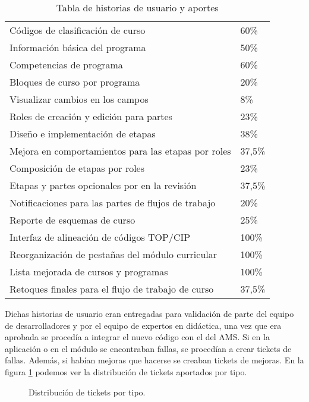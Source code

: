 \begin{table}[H]
\begin{tabular}{@{}ll@{}}
Códigos de clasificación de curso                   &  60\%  \\
Información básica del programa                     &  50\%  \\
Competencias de programa                            &  60\%  \\
Bloques de curso por programa                       &  20\%  \\
Visualizar cambios en los campos                    &   8\%  \\
Roles de creación y edición para partes             &  23\%  \\
Diseño e implementación de etapas                   &  38\%  \\
Mejora en comportamientos para las etapas por roles & 37,5\% \\
Composición de etapas por roles                     &  23\%  \\
Etapas y partes opcionales por en la revisión       & 37,5\% \\
Notificaciones para las partes de flujos de trabajo &  20\%  \\
Reporte de esquemas de curso                        &  25\%  \\
Interfaz de alineación de códigos TOP/CIP           & 100\%  \\
Reorganización de pestañas del módulo curricular    & 100\%  \\
Lista mejorada de cursos y programas                & 100\%  \\
Retoques finales para el flujo de trabajo de curso  & 37,5\% \\ \bottomrule
\end{tabular}
\caption{Tabla de historias de usuario y aportes}
\label{mis-aportes}
\end{table}

Dichas historias de usuario eran entregadas para validación de parte del equipo de desarrolladores y por el equipo de expertos en didáctica, una vez que era aprobada se procedía a integrar el nuevo código con el del AMS. Si en la aplicación o en el módulo se encontraban fallas, se procedían a crear tickets de fallas. Además, si habían mejoras que hacerse se creaban tickets de mejoras. En la figura \ref{tickets_by_type} podemos ver la distribución de tickets aportados por tipo.

\begin{figure}[H]
\centering
{}
\caption{Distribución de tickets por tipo.}
  \label{tickets_by_type}
\end{figure}

